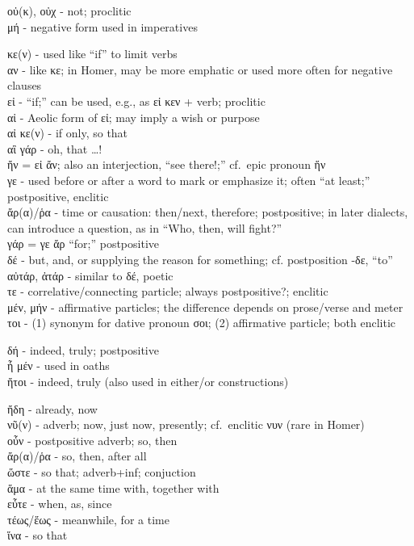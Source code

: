 \begin{small}

οὐ(κ), οὐχ - not; proclitic\\
μή - negative form used in imperatives\\



κε(ν) - used like ``if'' to limit verbs\\
αν - like κε; in Homer, may be more emphatic or used more often for negative clauses\\
εἰ - ``if;'' can be used, e.g., as εἰ κεν + verb; proclitic\\
αἰ - Aeolic form of εἰ; may imply a wish or purpose\\
αἰ κε(ν) - if only, so that\\
αἲ γάρ - oh, that \ldots !\\
ἤν = εἰ ἄν; also an interjection, ``see there!;'' cf.~epic pronoun ἥν\\
γε - used before or after a word to mark or emphasize it; often ``at least;'' postpositive, enclitic\\
ἄρ(α)/ῥα - time or causation: then/next, therefore; postpositive; in later dialects, can introduce
      a question, as in ``Who, then, will fight?''\\
γάρ = γε ἄρ ``for;'' postpositive\\
δέ - but, and, or supplying the reason for something; cf. postposition -δε, ``to''\\
αὐτάρ, ἀτάρ - similar to δέ, poetic\\
τε - correlative/connecting particle; always postpositive?; enclitic\\
μέν, μήν - affirmative particles; the difference depends on prose/verse and meter\\
τοι - (1) synonym for dative pronoun σοι; (2) affirmative particle; both enclitic\\


δή - indeed, truly; postpositive\\
ἦ μέν - used in oaths\\
ἤτοι - indeed, truly (also used in either/or constructions)\\


ἤδη - already, now\\
νῦ(ν) - adverb; now, just now, presently; cf.~enclitic νυν (rare in Homer)\\
οὖν - postpositive adverb; so, then\\
ἄρ(α)/ῥα - so, then, after all\\
ὥστε - so that; adverb+inf; conjuction\\
ἅμα - at the same time with, together with\\
εὖτε - when, as, since\\
τέως/ἕως - meanwhile, for a time\\
ἵνα - so that\\


\end{small}
